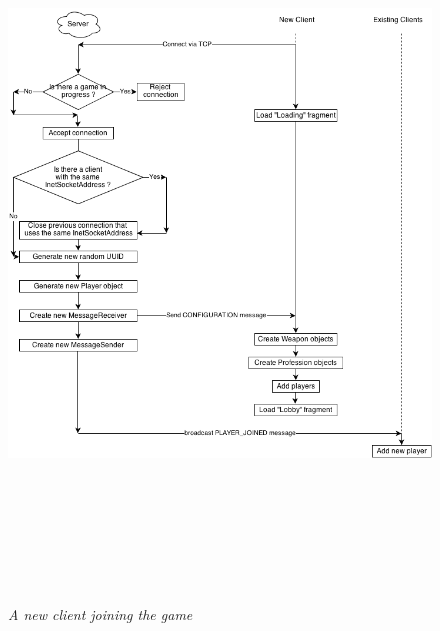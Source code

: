 \begin{figure}
\includegraphics[height=7.665in,width=6.23in]{./images/diagrams/Client-Server.png}
\caption{\small \sl A new client joining the game
\label{fig:client_server_flow}}
\end{figure}


